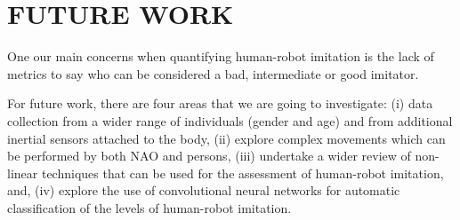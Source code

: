 \documentclass{sig-alternate-05-2015}
\begin{document}
\section{FUTURE WORK}
One our main concerns when quantifying human-robot imitation
is the lack of metrics to say who can be considered a bad, intermediate or good imitator.

For future work, there are four areas that we are going to investigate:
(i) data collection from a wider range of individuals (gender and age)
and from additional inertial sensors attached to the body,
(ii) explore complex movements which can be performed by both NAO and persons,
(iii) undertake a wider review of non-linear techniques that can be used for 
the assessment of human-robot imitation, and, 
(iv) explore the use of convolutional neural networks for automatic 
classification of the levels of human-robot imitation.






%
%
\end{document}
